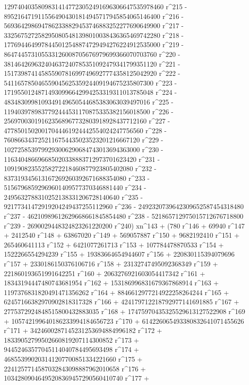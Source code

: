        12974040358098314147723052491696306647535978460 r^215 - 
       8952164719115564904301814945717945854065146400 r^216 - 
       5693642986947862338829453746883252277690649900 r^217 - 
       3325675272582950805481398010038436365469742280 r^218 - 
       1776944649978445012548874729494276224912535000 r^219 - 
       864744573105533126008705676979699366070703760 r^220 - 
       381464269632404637240785351092479341799351120 r^221 - 
       151739874145855907816997496927774358125042920 r^222 - 
       54116578504655904562535924409194675235807300 r^223 - 
       17195501248714930996642994253319311013785048 r^224 - 
       4834830998109349149650544685383063039497016 r^225 - 
       1194039789837792444531170875335382156018500 r^226 - 
       256970030191623568967732803918928437712160 r^227 - 
       47785015020017044461924442554024247756560 r^228 - 
       7608663437252116754435023523201216667120 r^229 - 
       1027258539799293006290684743013694363000 r^230 - 
       116340486696685020338883712973701623420 r^231 - 
       10919082355258272218460877923805402080 r^232 - 
       837319345613167269260392671688354080 r^233 - 
       51567968592969601409577370346881440 r^234 - 
       2495632788310252138331206728140640 r^235 - 
       92177341472919204249437255112960 r^236 - 
       2492320739642309652587454318480 r^237 - 
       46210989612629668661845854480 r^238 - 
       521865712975015712676718800 r^239 - 
       2690029448324823261220200 r^240) xn^143 + (780 r^146 + 
       69940 r^147 + 2412540 r^148 + 63867020 r^149 + 
       569057887 r^150 + 9682192410 r^151 + 265460641113 r^152 + 
       6421077261713 r^153 + 107784478870533 r^154 + 
       1522266554294239 r^155 + 19383664654944607 r^156 + 
       220830115394079696 r^157 + 2330186150376106716 r^158 + 
       23132747495092368349 r^159 + 221860193651991642251 r^160 + 
       2063276921603054417342 r^161 + 18343194447480743681954 r^162 + 
       153186996831679367868914 r^163 + 
       1197376831820491471356262 r^164 + 
       8846612977214922258264244 r^165 + 
       62457166382970902818317328 r^166 + 
       424179712218792977141691885 r^167 + 
       2775372924848515800432883035 r^168 + 
       17475970435325529613127522908 r^169 + 
       105742199640186233994184656723 r^170 + 
       614226065493380832641071455626 r^171 + 
       3424600287145231253694884996182 r^172 + 
       18339052799502660819207114300852 r^173 + 
       94452463577045114040784495693498 r^174 + 
       468553990203141207700851334221660 r^175 + 
       2241257714587032843098887962010658 r^176 + 
       10342809046495208369457290560410740 r^177 + 

